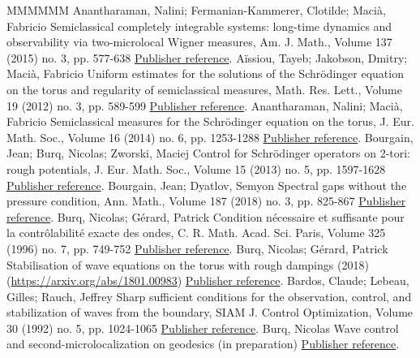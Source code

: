 \documentclass[11pt]{article}
\theoremstyle{definition}
\numberwithin{equation}{section}
\numberwithin{figure}{section}
\numberwithin{table}{section}
\begin{document}
\begin{thebibliography}{MMMMMM}
 Anantharaman, Nalini; Fermanian-Kammerer, Clotilde; Macià, Fabricio Semiclassical completely integrable systems: long-time dynamics and observability via two-microlocal Wigner measures, Am. J. Math., Volume 137 (2015) no. 3, pp. 577-638 \href{https://ahl.centre-mersenne.org/item/AHL_2019__2__331_0/#AFM}{Publisher reference}.
 Aïssiou, Tayeb; Jakobson, Dmitry; Macià, Fabricio Uniform estimates for the solutions of the Schrödinger equation on the torus and regularity of semiclassical measures, Math. Res. Lett., Volume 19 (2012) no. 3, pp. 589-599 \href{https://ahl.centre-mersenne.org/item/AHL_2019__2__331_0/#AJM}{Publisher reference}.
 Anantharaman, Nalini; Macià, Fabricio Semiclassical measures for the Schrödinger equation on the torus, J. Eur. Math. Soc., Volume 16 (2014) no. 6, pp. 1253-1288 \href{https://ahl.centre-mersenne.org/item/AHL_2019__2__331_0/#AM}{Publisher reference}.
 Bourgain, Jean; Burq, Nicolas; Zworski, Maciej Control for Schrödinger operators on 2-tori: rough potentials, J. Eur. Math. Soc., Volume 15 (2013) no. 5, pp. 1597-1628 \href{https://ahl.centre-mersenne.org/item/AHL_2019__2__331_0/#BBZ}{Publisher reference}.
 Bourgain, Jean; Dyatlov, Semyon Spectral gaps without the pressure condition, Ann. Math., Volume 187 (2018) no. 3, pp. 825-867 \href{https://ahl.centre-mersenne.org/item/AHL_2019__2__331_0/#BD}{Publisher reference}.
 Burq, Nicolas; Gérard, Patrick Condition nécessaire et suffisante pour la contrôlabilité exacte des ondes, C. R. Math. Acad. Sci. Paris, Volume 325 (1996) no. 7, pp. 749-752 \href{https://ahl.centre-mersenne.org/item/AHL_2019__2__331_0/#BG}{Publisher reference}.
 Burq, Nicolas; Gérard, Patrick Stabilisation of wave equations on the torus with rough dampings (2018) (\url{https://arxiv.org/abs/1801.00983}) \href{https://ahl.centre-mersenne.org/item/AHL_2019__2__331_0/#Bu16}{Publisher reference}.
 Bardos, Claude; Lebeau, Gilles; Rauch, Jeffrey Sharp sufficient conditions for the observation, control, and stabilization of waves from the boundary, SIAM J. Control Optimization, Volume 30 (1992) no. 5, pp. 1024-1065 \href{https://ahl.centre-mersenne.org/item/AHL_2019__2__331_0/#BLR}{Publisher reference}.
 Burq, Nicolas Wave control and second-microlocalization on geodesics (in preparation) \href{https://ahl.centre-mersenne.org/item/AHL_2019__2__331_0/#Bu17}{Publisher reference}.

\end{thebibliography}
\end{document}
